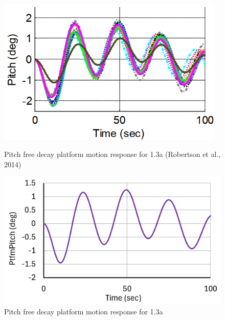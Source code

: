 \documentclass[a4paper]{article}
\begin{document}
\begin{figure}[H]
    \begin{minipage}{0.48\textwidth}
        \centering
        \includegraphics[width=0.97\textwidth]{1.3a_pitch.png}
        \caption{\small Pitch free decay platform motion response for 1.3a (Robertson et al., 2014)}
        \label{fig:1.3a_pitch}
    \end{minipage}
    \hfill
    \begin{minipage}{0.49\textwidth}
        \centering
        \includegraphics[width=1\textwidth]{1.3a_pitch_mine.png}
        \caption{\small Pitch free decay platform motion response for 1.3a}
        \label{fig:1.3a_pitch_mine}
    \end{minipage}
\end{figure}
\end{document}
